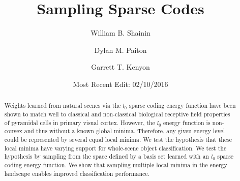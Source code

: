 \documentclass[smallextended]{svjour3}       %
\begin{document}
\title{Sampling Sparse Codes
}



\author{William B. Shainin \and
        Dylan M. Paiton \and
        Garrett T. Kenyon}





\date{Most Recent Edit: 02/10/2016}

\maketitle

\begin{abstract}
Weights learned from natural scenes via the $l_{0}$ sparse coding energy function have been shown to match well to classical and non-classical biological receptive field properties of pyramidal cells in primary visual cortex. However, the $l_{0}$ energy function is non-convex and thus without a known global minima. Therefore, any given energy level could be represented by several equal local minima. We test the hypothesis that these local minima have varying support for whole-scene object classification. We test the hypothesis by sampling from the space defined by a basis set learned with an $l_{0}$ sparse coding energy function. We show that sampling multiple local minima in the energy landscape enables improved classification performance.
\end{abstract}



\end{document}
